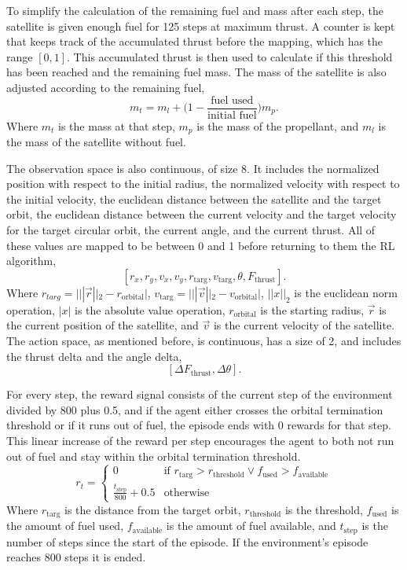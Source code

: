 To simplify the calculation of the remaining fuel and mass after each step, the satellite is given enough fuel for 125 steps at maximum thrust. A counter is kept that keeps track of the accumulated thrust before the mapping, which has the range $[0, 1]$. This accumulated thrust is then used to calculate if this threshold has been reached and the remaining fuel mass. The mass of the satellite is also adjusted according to the remaining fuel, $$m_t=m_l+\bigg(1-\frac{\text{fuel used}}{\text{initial fuel}}\bigg)m_p.$$ Where $m_t$ is the mass at that step, $m_p$ is the mass of the propellant, and $m_l$ is the mass of the satellite without fuel.

The observation space is also continuous, of size 8. It includes the normalized position with respect to the initial radius, the normalized velocity with respect to the initial velocity, the euclidean distance between the satellite and the target orbit, the euclidean distance between the current velocity and the target velocity for the target circular orbit, the current angle, and the current thrust. All of these values are mapped to be between 0 and 1 before returning to them the RL algorithm,
$$[r_x, r_y, v_x, v_y, r_{\text{targ}}, v_{\text{targ}}, \theta, F_{\text{thrust}}].$$
Where $r_{targ}=|||\vec{r}||_2 - r_\text{orbital}|$, $v_{\text{targ}}=|||\vec{v}||_2-v_\text{orbital}|$, $||x||_2$ is the euclidean norm operation, $|x|$ is the absolute value operation, $r_\text{orbital}$ is the starting radius, $\vec{r}$ is the current position of the satellite, and $\vec{v}$ is the current velocity of the satellite. The action space, as mentioned before, is continuous, has a size of 2, and includes the thrust delta and the angle delta, $$[\Delta F_{\text{thrust}}, \Delta \theta].$$ 

For every step, the reward signal consists of the current step of the environment divided by 800 plus 0.5, and if the agent either crosses the orbital termination threshold or if it runs out of fuel, the episode ends with 0 rewards for that step. This linear increase of the reward per step encourages the agent to both not run out of fuel and stay within the orbital termination threshold. \begin{equation}\label{eq:reward}
r_t = \begin{cases}
	0 & \mbox{if }r_{\text{targ}}>r_{\text{threshold}}\lor f_{\text{used}}>f_{\text{available}} \\
	\frac{t_{\text{step}}}{800} + 0.5 & \mbox{otherwise}
\end{cases}
\end{equation}
Where $r_{\text{targ}}$ is the distance from the target orbit, $r_{\text{threshold}}$ is the threshold, $f_{\text{used}}$ is the amount of fuel used, $f_{\text{available}}$ is the amount of fuel available, and $t_{\text{step}}$ is the number of steps since the start of the episode. If the environment's episode reaches 800 steps it is ended. 

